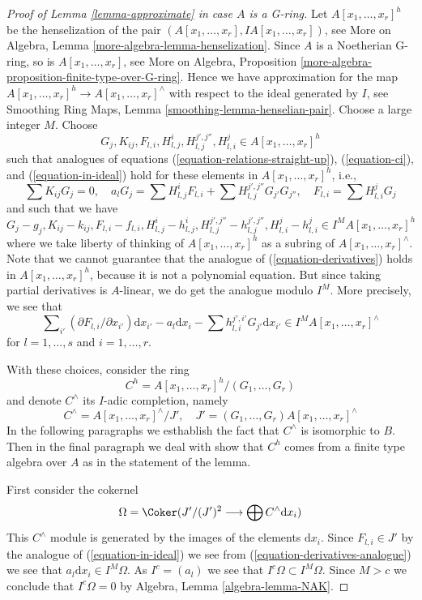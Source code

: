 \begin{proof}[Proof of Lemma \ref{lemma-approximate} in case $A$ is a G-ring]
\medskip\noindent
Let $A[x_1, \ldots, x_r]^h$ be the henselization of the
pair $(A[x_1, \ldots, x_r], IA[x_1, \ldots, x_r])$, see
More on Algebra, Lemma \ref{more-algebra-lemma-henselization}.
Since $A$ is a Noetherian G-ring, so is $A[x_1, \ldots, x_r]$, see
More on Algebra, Proposition
\ref{more-algebra-proposition-finite-type-over-G-ring}.
Hence we have approximation for the map
$A[x_1, \ldots, x_r]^h \to A[x_1, \ldots, x_r]^\wedge$
with respect to the ideal generated by $I$, see
Smoothing Ring Maps, Lemma \ref{smoothing-lemma-henselian-pair}.
Choose a large integer $M$. Choose
$$
G_j, K_{ij}, F_{l, i}, H_{l, j}^i, H_{l, j}^{j', j''}, H_{l, i}^j
\in A[x_1, \ldots, x_r]^h
$$
such that analogues of equations (\ref{equation-relations-straight-up}),
(\ref{equation-ci}), and (\ref{equation-in-ideal})
hold for these elements in $A[x_1, \ldots, x_r]^h$, i.e.,
$$
\sum K_{ij}G_j = 0,\quad
a_l G_j = \sum H_{l, j}^iF_{l, i} +
\sum H_{l, j}^{j', j''} G_{j'} G_{j''},\quad
F_{l, i} = \sum H_{l, i}^j G_j
$$
and such that we have
$$
G_j - g_j, K_{ij} - k_{ij}, F_{l, i} - f_{l, i},
H_{l, j}^i - h_{l, j}^i, H_{l, j}^{j', j''} - h_{l, j}^{j', j''},
H_{l, i}^j - h_{l, i}^j
\in I^M A[x_1, \ldots, x_r]^h
$$
where we take liberty of thinking of $A[x_1, \ldots, x_r]^h$ as a
subring of $A[x_1, \ldots, x_r]^\wedge$.
Note that we cannot guarantee that the analogue of
(\ref{equation-derivatives}) holds
in $A[x_1, \ldots, x_r]^h$, because it is not a polynomial equation.
But since taking partial derivatives is $A$-linear, we do get
the analogue modulo $I^M$. More precisely, we see that
\begin{equation}
\label{equation-derivatives-analogue}
\sum\nolimits_{i'} (\partial F_{l, i}/ \partial x_{i'}) \text{d}x_{i'}
- a_l \text{d}x_i - \sum h_{l, i}^{j', i'} G_{j'} \text{d}x_{i'}
\in I^MA[x_1, \ldots, x_r]^\wedge
\end{equation}
for $l = 1, \ldots, s$ and $i = 1, \ldots, r$.

\medskip\noindent
With these choices, consider the ring
$$
C^h = A[x_1, \ldots, x_r]^h/(G_1, \ldots, G_r)
$$
and denote $C^\wedge$ its $I$-adic completion, namely
$$
C^\wedge = A[x_1, \ldots, x_r]^\wedge/J',\quad
J' = (G_1, \ldots, G_r)A[x_1, \ldots, x_r]^\wedge
$$
In the following paragraphs we esthablish the fact that $C^\wedge$
is isomorphic to $B$. Then in the final paragraph we deal with
show that $C^h$ comes from a finite type algebra
over $A$ as in the statement of the lemma.

\medskip\noindent
First consider the cokernel
$$
\Omega = \Coker(J'/(J')^2 \longrightarrow \bigoplus C^\wedge \text{d}x_i)
$$
This $C^\wedge$ module is generated by the images of the elements
$\text{d}x_i$. Since $F_{l, i} \in J'$ by the analogue of
(\ref{equation-in-ideal}) we see from
(\ref{equation-derivatives-analogue}) we see
that $a_l \text{d}x_i \in I^M\Omega$. As $I^c = (a_l)$ we see that
$I^c \Omega \subset I^M \Omega$. Since $M > c$ we conclude that
$I^c \Omega = 0$ by Algebra, Lemma \ref{algebra-lemma-NAK}.


\end{proof}
